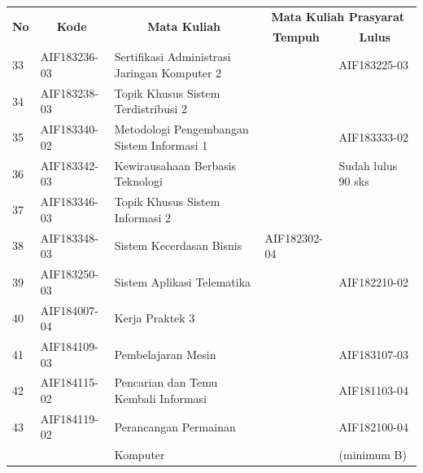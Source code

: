 \begin{table}[H]
	\centering
		\begin{tabular}{|p{0.5cm}|p{2.85cm}|p{4.95cm}|p{2.7cm}|p{2.7cm}|}
			\hline
			\multicolumn{1}{|c|}{\multirow{2}{*}{\textbf{No}}} & \multicolumn{1}{c|}{\multirow{2}{*}{\textbf{Kode}}} & \multicolumn{1}{c|}{\multirow{2}{*}{\textbf{Mata Kuliah}}} & \multicolumn{2}{c|}{\textbf{Mata Kuliah Prasyarat}} \\ \cline{4-5}
			 &  &  & \multicolumn{1}{c|}{\textbf{Tempuh}} & \multicolumn{1}{c|}{\textbf{Lulus}} \\ \hline
33 & AIF183236-03 & Sertifikasi Administrasi Jaringan Komputer 2                     &              & AIF183225-03       \\ \hline
34 & AIF183238-03 & Topik Khusus Sistem Terdistribusi 2                              &              &                    \\ \hline
35 & AIF183340-02 & Metodologi Pengembangan Sistem Informasi 1                       &              & AIF183333-02       \\ \hline
36 & AIF183342-03 & Kewirausahaan Berbasis Teknologi                                 &              & Sudah lulus 90 sks \\ \hline
37 & AIF183346-03 & Topik Khusus Sistem Informasi 2                                  &              &                    \\ \hline
38 & AIF183348-03 & Sistem Kecerdasan Bisnis                                         & AIF182302-04 &                    \\ \hline
39 & AIF183250-03 & Sistem Aplikasi Telematika                                       &              & AIF182210-02       \\ \hline
40 & AIF184007-04 & Kerja Praktek 3                                                  &              &                    \\ \hline
41 & AIF184109-03 & Pembelajaran Mesin                                               &              & AIF183107-03       \\ \hline
42 & AIF184115-02 & Pencarian dan Temu Kembali Informasi                             &              & AIF181103-04       \\ \hline
43 & AIF184119-02 & Perancangan Permainan                                            &              & AIF182100-04       \\
   &              & Komputer                                                         &              & (minimum B)        \\

\end{tabular}
\end{table}
